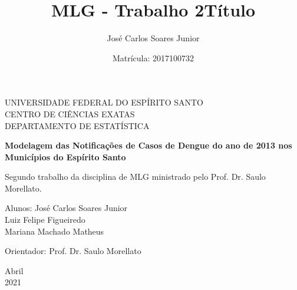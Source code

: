 \documentclass[12pt,a4paper]{article}\usepackage[]{graphicx}\usepackage[]{color}
\title{MLG - Trabalho 2}
\author{José Carlos Soares Junior }
\date{Matrícula: 2017100732}
\begin{document}
\begin{titlepage}
	\begin{center}
	

		\Huge{UNIVERSIDADE FEDERAL DO ESPÍRITO SANTO}\\
		\large{CENTRO DE CIÊNCIAS EXATAS}\\ 
		\large{DEPARTAMENTO DE ESTATÍSTICA}\\ 
\vspace{15pt}
        
        \vspace{85pt}
        
		\textbf{\LARGE{Modelagem das Notificações de Casos de Dengue do ano de 2013 nos Municípios do Espírito Santo}}
		\title{\large{Título}}
			
	\end{center}
\vspace{1,5cm}
	
	\begin{flushright}

   \begin{list}{}{
      \setlength{\leftmargin}{4.5cm}
      \setlength{\rightmargin}{0cm}
      \setlength{\labelwidth}{0pt}
      \setlength{\labelsep}{\leftmargin}}

      \item Segundo trabalho da disciplina de MLG ministrado pelo Prof. Dr. Saulo Morellato.

      \begin{list}{}{
      \setlength{\leftmargin}{0cm}
      \setlength{\rightmargin}{0cm}
      \setlength{\labelwidth}{0pt}
      \setlength{\labelsep}{\leftmargin}}

			\item Alunos: José Carlos Soares Junior\\
			         \;\;\;\;\;\;\;\;\;\;\;\;\;     Luiz Felipe Figueiredo\\
			         \;\;\;\;\;\;\;\;\;\;\;\;\;     Mariana Machado Matheus 
            \item Orientador: Prof. Dr. Saulo Morellato\

      \end{list}
   \end{list}
\end{flushright}
\vspace{1cm}
\begin{center}
		\vspace{\fill}
		 Abril\\
		 2021
			\end{center}
\end{titlepage}
\newpage
\end{document}
